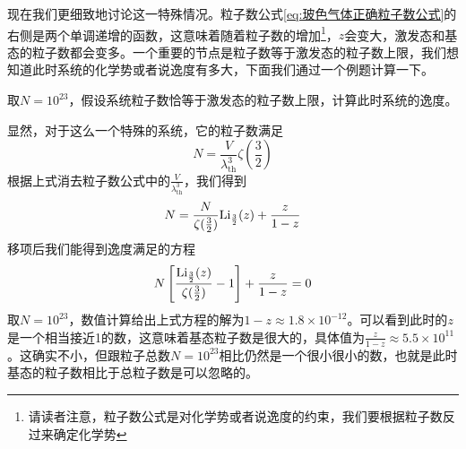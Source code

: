 \documentclass[../../main.tex]{subfiles}
\begin{document}
现在我们更细致地讨论这一特殊情况。粒子数公式\eqref{eq:玻色气体正确粒子数公式}的右侧是两个单调递增的函数，这意味着随着粒子数的增加\footnote{请读者注意，粒子数公式是对化学势或者说逸度的约束，我们要根据粒子数反过来确定化学势}，\(z\)会变大，激发态和基态的粒子数都会变多。一个重要的节点是粒子数等于激发态的粒子数上限，我们想知道此时系统的化学势或者说逸度有多大，下面我们通过一个例题计算一下。
\begin{example}
    取\(N=10^{23}\)，假设系统粒子数恰等于激发态的粒子数上限，计算此时系统的逸度。
    \begin{solution}
        显然，对于这么一个特殊的系统，它的粒子数满足
        \begin{equation}
            N=\frac{V}{\lambda_{\mathrm{th}}^3}\zeta(\frac{3}{2})
        \end{equation}
        根据上式消去粒子数公式中的\(\frac{V}{\lambda_{\mathrm{th}}^3}\)，我们得到
        \begin{equation}
            N=\frac{N}{\zeta(\frac{3}{2})}\mathrm{Li}_{\frac{3}{2}}(z)+\frac{z}{1-z}
        \end{equation}
        移项后我们能得到逸度满足的方程
        \begin{equation}
            N\left[\frac{\mathrm{Li}_{\frac{3}{2}}(z)}{\zeta(\frac{3}{2})}-1\right]+\frac{z}{1-z}=0
        \end{equation}
        取\(N=10^{23}\)，数值计算给出上式方程的解为\(1-z\approx1.8\times10^{-12}\)。可以看到此时的\(z\)是一个相当接近1的数，这意味着基态粒子数是很大的，具体值为\(\frac{z}{1-z}\approx5.5\times10^{11}\)。这确实不小，但跟粒子总数\(N=10^{23}\)相比仍然是一个很小很小的数，也就是此时基态的粒子数相比于总粒子数是可以忽略的。
    \end{solution}
\end{example}
\end{document}
